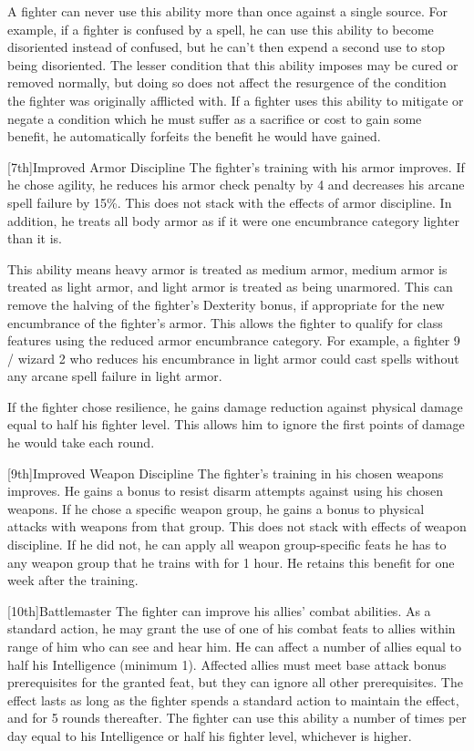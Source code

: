 \par A fighter can never use this ability more than once against a single source.
For example, if a fighter is confused by a  spell, he can use this ability to become disoriented instead of confused, but he can't then expend a second use to stop being disoriented.
The lesser condition that this ability imposes may be cured or removed normally, but doing so does not affect the resurgence of the condition the fighter was originally afflicted with.
If a fighter uses this ability to mitigate or negate a condition which he must suffer as a sacrifice or cost to gain some benefit, he automatically forfeits the benefit he would have gained.

[7th]{Improved Armor Discipline}
The fighter's training with his armor improves.
If he chose agility, he reduces his armor check penalty by 4 and decreases his arcane spell failure by 15\%.
This does not stack with the effects of armor discipline.
In addition, he treats all body armor as if it were one encumbrance category lighter than it is.
\par This ability means heavy armor is treated as medium armor, medium armor is treated as light armor, and light armor is treated as being unarmored.
This can remove the halving of the fighter's Dexterity bonus, if appropriate for the new encumbrance of the fighter's armor.
This allows the fighter to qualify for class features using the reduced armor encumbrance category.
For example, a fighter 9 / wizard 2 who reduces his encumbrance in light armor could cast spells without any arcane spell failure in light armor.

If the fighter chose resilience, he gains damage reduction against physical damage equal to half his fighter level. This allows him to ignore the first points of damage he would take each round.

[9th]{Improved Weapon Discipline}
The fighter's training in his chosen weapons improves.
He gains a  bonus to resist disarm attempts against using his chosen weapons.
If he chose a specific weapon group, he gains a  bonus to physical attacks with weapons from that group.
This does not stack with effects of weapon discipline.
If he did not, he can apply all weapon group-specific feats he has to any weapon group that he trains with for 1 hour.
He retains this benefit for one week after the training.

[10th]{Battlemaster}
The fighter can improve his allies' combat abilities.
As a standard action, he may grant the use of one of his combat feats to allies within \rngmed range of him who can see and hear him.
He can affect a number of allies equal to half his Intelligence (minimum 1).
Affected allies must meet base attack bonus prerequisites for the granted feat, but they can ignore all other prerequisites.
The effect lasts as long as the fighter spends a standard action to maintain the effect, and for 5 rounds thereafter.
The fighter can use this ability a number of times per day equal to his Intelligence or half his fighter level, whichever is higher.

